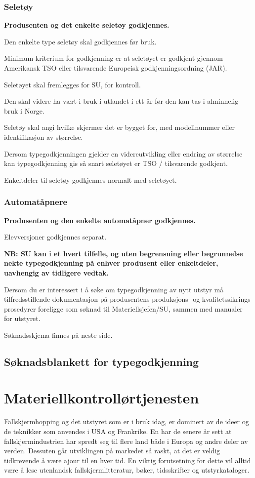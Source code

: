 \subsubsection{Seletøy}
\textbf{Produsenten og det enkelte seletøy godkjennes.}

Den enkelte type seletøy skal godkjennes før bruk.

Minimum kriterium for godkjenning er at seletøyet er godkjent gjennom Amerikansk TSO eller tilsvarende Europeisk godkjenningsordning (JAR).

Seletøyet skal fremlegges for SU, for kontroll.

Den skal videre ha vært i bruk i utlandet i ett år før den kan tas i alminnelig bruk i Norge.

Seletøy skal angi hvilke skjermer det er bygget for, med modellnummer eller identifikasjon av størrelse.

Dersom typegodkjenningen gjelder en videreutvikling eller endring av størrelse kan typegodkjenning gis så snart seletøyet er TSO / tilsvarende godkjent.

Enkeltdeler til seletøy godkjennes normalt med seletøyet.

\subsubsection{Automatåpnere}
\textbf{Produsenten og den enkelte automatåpner godkjennes.}

Elevversjoner godkjennes separat.

\textbf{NB: SU kan i et hvert tilfelle, og uten begrensning eller begrunnelse nekte typegodkjenning på enhver produsent eller enkeltdeler, uavhengig av tidligere vedtak.}

Dersom du er interessert i å søke om typegodkjenning av nytt utstyr må tilfredsstillende dokumentasjon på produsentens produksjons- og kvalitetssikrings prosedyrer foreligge som søknad til Materiellsjefen/SU, sammen med manualer for utstyret.

Søknadsskjema finnes på neste side.

\subsection{Søknadsblankett for typegodkjenning}

\section{Materiellkontrollørtjenesten}
Fallskjermhopping og det utstyret som er i bruk idag, er dominert av de ideer og de teknikker som anvendes i USA og Frankrike. En har de senere år sett at fallskjermindustrien har spredt seg til flere land både i Europa og andre deler av verden. Dessuten går utviklingen på markedet så raskt, at det er veldig tidkrevende å være ajour til en hver tid. En viktig forutsetning for dette vil alltid være å lese utenlandsk fallskjermlitteratur, bøker, tidsskrifter og utstyrkataloger.

